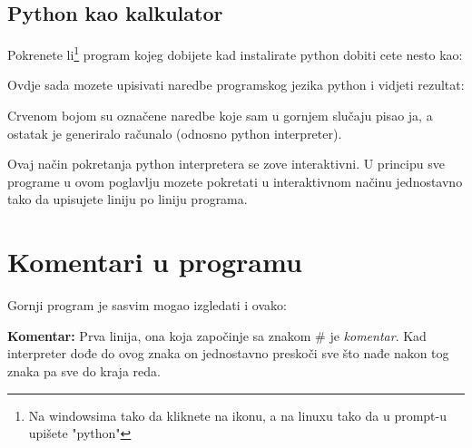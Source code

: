 \subsection{Python kao kalkulator}

Pokrenete li\footnote{Na windowsima tako da kliknete na ikonu, a
na linuxu tako da u prompt-u upišete "python"} program kojeg
dobijete kad instalirate python dobiti cete nesto kao:


Ovdje sada  mozete upisivati naredbe programskog jezika python i
vidjeti rezultat:


Crvenom bojom su označene naredbe koje sam u gornjem slučaju
pisao ja, a ostatak je generiralo računalo (odnosno python
interpreter).

Ovaj način pokretanja python interpretera se zove interaktivni. U
principu sve programe u ovom poglavlju mozete pokretati u interaktivnom
načinu jednostavno tako da upisujete liniju po liniju programa.

\section{Komentari u programu}

	Gornji program je sasvim mogao izgledati i ovako:


	\textbf{Komentar:}
	Prva linija, ona koja započinje sa znakom \# je \emph{komentar}.
	Kad interpreter dođe do ovog znaka on jednostavno preskoči sve
	što nađe nakon tog znaka pa sve do kraja reda.

